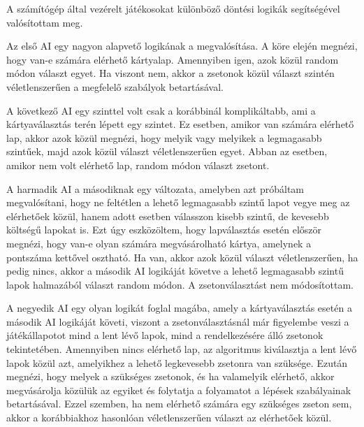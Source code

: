 
A számítógép által vezérelt játékosokat különböző döntési logikák segítségével valósítottam meg.

Az első AI egy nagyon alapvető logikának a megvalósítása. A köre elején megnézi, hogy van-e számára elérhető kártyalap. Amennyiben igen, azok közül random módon választ egyet. Ha viszont nem, akkor a zsetonok közül választ szintén véletlenszerűen a megfelelő szabályok betartásával.

A következő AI egy szinttel volt csak a korábbinál komplikáltabb, ami a kártyaválasztás terén lépett egy szintet. Ez esetben, amikor van számára elérhető lap, akkor azok közül megnézi, hogy melyik vagy melyikek a legmagasabb szintűek, majd azok közül választ véletlenszerűen egyet. Abban az esetben, amikor nem volt elérhető lap, random módon választ zsetont.

A harmadik AI a másodiknak egy változata, amelyben azt próbáltam megvalósítani, hogy ne feltétlen a lehető legmagasabb szintű lapot vegye meg az elérhetőek közül, hanem adott esetben válasszon kisebb szintű, de kevesebb költségű lapokat is. Ezt úgy eszközöltem, hogy lapválasztás esetén először megnézi, hogy van-e olyan számára megvásárolható kártya, amelynek a pontszáma kettővel osztható. Ha van, akkor azok közül választ véletlenszerűen, ha pedig nincs, akkor a második AI logikáját követve a lehető legmagasabb szintű lapok halmazából választ random módon. A zsetonválasztást nem módosítottam.

\newpage

A negyedik AI egy olyan logikát foglal magába, amely a kártyaválasztás esetén a második AI logikáját követi, viszont a zsetonválasztásnál már figyelembe veszi a játékállapotot mind a lent lévő lapok, mind a rendelkezésére álló zsetonok tekintetében. Amennyiben nincs elérhető lap, az algoritmus kiválasztja a lent lévő lapok közül azt, amelyikhez a lehető legkevesebb zsetonra van szüksége. Ezután megnézi, hogy melyek a szükséges zsetonok, és ha valamelyik elérhető, akkor megvásárolja közülük az egyiket és folytatja a folyamatot a lépések szabályainak betartásával. Ezzel szemben, ha nem elérhető számára egy szükséges zseton sem, akkor a korábbiakhoz hasonlóan véletlenszerűen választ az elérhetőek közül.

